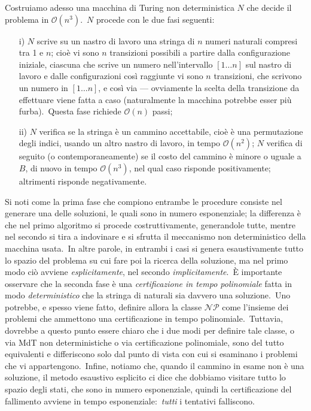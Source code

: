 \begin{example} 
    Costruiamo adesso una macchina di Turing non deterministica $N$ che decide il problema in $\mathcal{O}(n^3)$.\
    $N$ procede con le due fasi seguenti:\
    \begin{itemize}
        \item[i)] $N$ scrive su un nastro di lavoro una stringa di $n$ numeri naturali compresi tra 1 e $n$; cioè vi sono $n$ transizioni possibili a partire dalla configurazione iniziale, ciascuna che scrive un numero nell'intervallo $[1 \dots n]$ sul nastro di lavoro e dalle configurazioni così raggiunte vi sono $n$ transizioni, che scrivono un numero in $[1 \dots n]$, e così via --- ovviamente la scelta della transizione da effettuare viene fatta a caso (naturalmente la macchina potrebbe esser più furba).\ Questa fase richiede $\mathcal{O}(n)$ passi;
        \item[ii)] $N$ verifica se la stringa è un cammino accettabile, cioè è una permutazione degli indici, usando un altro nastro di lavoro, in tempo $\mathcal{O}(n^2)$; $N$ verifica di seguito (o contemporaneamente) se il costo del cammino è minore o uguale a $B$, di nuovo in tempo $\mathcal{O}(n^3)$, nel qual caso risponde positivamente; altrimenti risponde negativamente.
    \end{itemize}

    \noindent Si noti come la prima fase che compiono entrambe le procedure consiste nel generare una delle soluzioni, le quali sono in numero esponenziale; la differenza è che nel primo algoritmo si procede costruttivamente, generandole tutte, mentre nel secondo si tira a indovinare e si sfrutta il meccanismo non deterministico della macchina usata.\
    In altre parole, in entrambi i casi si genera esaustivamente tutto lo spazio del problema su cui fare poi la ricerca della soluzione, ma nel primo modo ciò avviene \textit{esplicitamente}, nel secondo \textit{implicitamente}.\
    È importante osservare che la seconda fase è una \textit{certificazione in tempo polinomiale} fatta in modo \textit{deterministico} che la stringa di naturali sia davvero una soluzione.\
    Uno potrebbe, e spesso viene fatto, definire allora la classe $\mathcal{NP}$ come l'insieme dei problemi che ammettono una certificazione in tempo polinomiale.\
    Tuttavia, dovrebbe a questo punto essere chiaro che i due modi per definire tale classe, o via MdT non deterministiche o via certificazione polinomiale, sono del tutto equivalenti e differiscono solo dal punto di vista con cui si esaminano i problemi che vi appartengono.\
    Infine, notiamo che, quando il cammino in esame non è una soluzione, il metodo esaustivo esplicito ci dice che dobbiamo visitare tutto lo spazio degli stati, che sono in numero esponenziale, quindi la certificazione del fallimento avviene in tempo esponenziale:\ \textit{tutti} i tentativi falliscono.\


\end{example}
